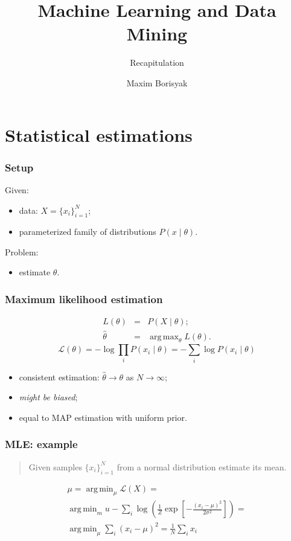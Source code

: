 \documentclass[mathserif, aspectratio=43]{beamer}
\title{Machine Learning and Data Mining}
\subtitle{Recapitulation}
\author{Maxim Borisyak}
\institute{National Research University Higher School of Economics (HSE)}
\DeclareMathOperator*{\argmin}{\mathrm{arg\,min}}
\DeclareMathOperator*{\argmax}{\mathrm{arg\,max}}
\begin{document}
\begin{frame}[plain]
	\titlepage
\end{frame}

\section{Statistical estimations}



\begin{frame}[fragile]
\frametitle{Setup}
Given:
\begin{itemize}
\item data: $X = \{ x_i \}^N_{i = 1}$;
\item parameterized family of distributions $P(x \mid \theta)$.
\end{itemize}
Problem:
\begin{itemize}
\item estimate $\theta$.
\end{itemize}

\end{frame}


\begin{frame}[fragile]
\frametitle{Maximum likelihood estimation}
\begin{eqnarray*}
L(\theta) &=& P(X \mid \theta);\\
\hat{\theta} &=& \argmax_\theta L(\theta).
\end{eqnarray*}
\begin{equation*}
\mathcal{L}(\theta) = -\log \prod_i P(x_i \mid \theta) = -\sum_i \log P(x_i \mid \theta)
\end{equation*}
\begin{itemize}
\item consistent estimation: $\hat{\theta} \to \theta$ as $N \to \infty$;
\item \textit{might be biased};
\item equal to MAP estimation with uniform prior.
\end{itemize}

\end{frame}


\begin{frame}[fragile]
\frametitle{MLE: example}
\begin{quote}
Given samples $\{ x_i \}^N_{i = 1}$ from a normal distribution estimate its mean.

\end{quote}
\begin{multline*}
  \mu = \argmin_\mu \mathcal{L}(X) = \\[3mm]
    \argmin_mu -\sum_i \log \left(\frac{1}{Z} \exp\left[ -\frac{(x_i - \mu) ^ 2}{2 \sigma^2}\right]\right) = \\[3mm]
    \argmin_\mu \sum_i (x_i - \mu) ^ 2 = \frac{1}{N} \sum_i x_i
\end{multline*}

\end{frame}
\end{document}
